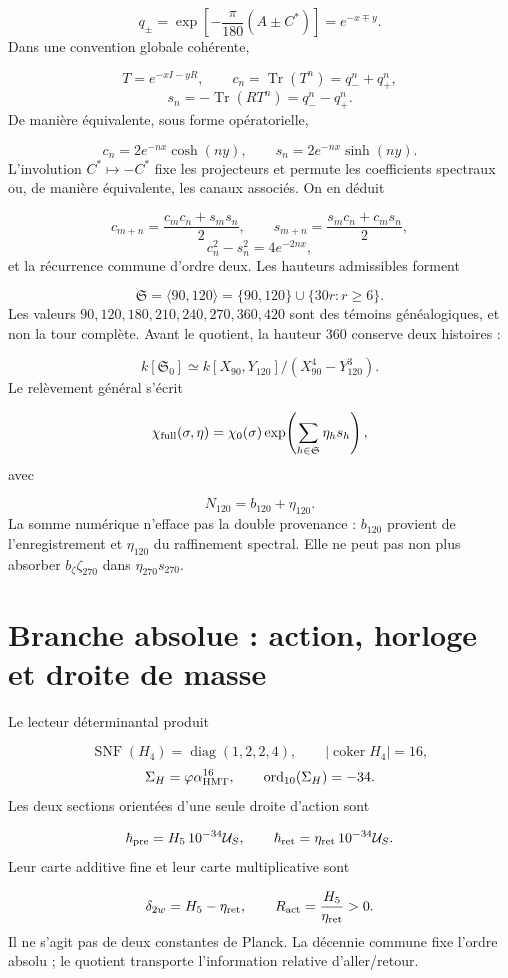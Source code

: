 \[
 q_\pm=\exp\!\left[-\frac{\pi}{180}(A\pm C^*)\right]
 =e^{-x\mp y}.
\]
Dans une convention globale cohérente,

\[
 T=e^{-xI-yR},\qquad
 c_n=\operatorname{Tr}(T^n)=q_-^n+q_+^n,
\]
\[
 s_n=-\operatorname{Tr}(RT^n)=q_-^n-q_+^n.
\]
De manière équivalente, sous forme opératorielle,

\[
 c_n=2e^{-nx}\cosh(ny),\qquad
 s_n=2e^{-nx}\sinh(ny).
\]
L'involution \(C^*\mapsto-C^*\) fixe les projecteurs et permute les coefficients spectraux ou, de manière équivalente, les canaux associés. On en déduit

\[
 c_{m+n}=\frac{c_mc_n+s_ms_n}{2},\qquad
 s_{m+n}=\frac{s_mc_n+c_ms_n}{2},
\]
\[
 c_n^2-s_n^2=4e^{-2nx},
\]
et la récurrence commune d'ordre deux. Les hauteurs admissibles forment

\[
 \mathfrak S=\langle90,120\rangle
 =\{90,120\}\cup\{30r:r\ge6\}.
\]
Les valeurs \(90,120,180,210,240,270,360,420\) sont des témoins généalogiques, et non la tour complète. Avant le quotient, la hauteur 360 conserve deux histoires :

\[
 k[\mathfrak S_0]
 \simeq k[X_{90},Y_{120}]/(X_{90}^4-Y_{120}^3).
\]
Le relèvement général s'écrit

\[
 \chi_{\rm full}(\sigma,\eta)
 =\chi_0(\sigma)
  \exp\!\left(\sum_{h\in\mathfrak S}\eta_hs_h\right),
\]
avec

\[
 N_{120}=b_{120}+\eta_{120}.
\]
La somme numérique n'efface pas la double provenance : \(b_{120}\) provient de l'enregistrement et \(\eta_{120}\) du raffinement spectral. Elle ne peut pas non plus absorber \(b_\zeta\zeta_{270}\) dans \(\eta_{270}s_{270}\).

\section{Branche absolue : action, horloge et droite de masse}
Le lecteur déterminantal produit

\[
 \operatorname{SNF}(H_4)=\operatorname{diag}(1,2,2,4),\qquad
 |\operatorname{coker}H_4|=16,
\]
\[
 \Sigma_H=\varphi\alpha_{\rm HMT}^{16},\qquad
 \operatorname{ord}_{10}(\Sigma_H)=-34.
\]
Les deux sections orientées d'une seule droite d'action sont

\[
 \hbar_{\rm pre}=H_5\,10^{-34}\mathcal U_S,
 \qquad
 \hbar_{\rm ret}=\eta_{\rm ret}\,10^{-34}\mathcal U_S.
\]
Leur carte additive fine et leur carte multiplicative sont

\[
 \delta_{2w}=H_5-\eta_{\rm ret},\qquad
 R_{\rm act}=\frac{H_5}{\eta_{\rm ret}}>0.
\]
Il ne s'agit pas de deux constantes de Planck. La décennie commune fixe l'ordre absolu ; le quotient transporte l'information relative d'aller/retour.

